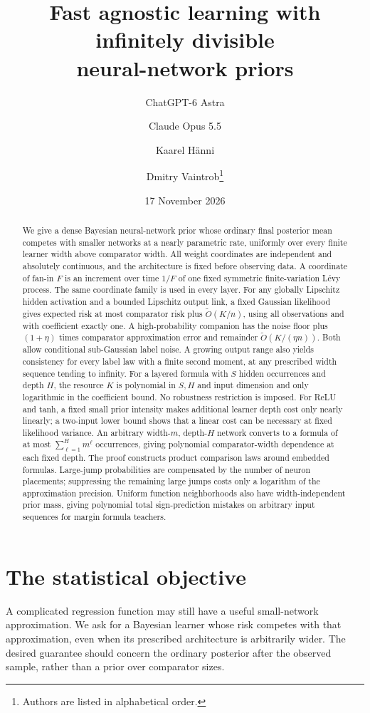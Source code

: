 \documentclass[11pt]{article}
\title{Fast agnostic learning with infinitely divisible\\neural-network priors}
\author{ChatGPT-6 Astra \and Claude Opus 5.5 \and Kaarel H\"anni \and
Dmitry Vaintrob\thanks{Authors are listed in alphabetical order.}}
\date{17 November 2026}
\theoremstyle{remark}\newtheorem{remark}[theorem]{Remark}
\begin{document}
\maketitle
\begin{abstract}
We give a dense Bayesian neural-network prior whose ordinary final posterior mean competes with smaller networks at a nearly parametric rate, uniformly over every finite learner width above comparator width. All weight coordinates are independent and absolutely continuous, and the architecture is fixed before observing data. A coordinate of fan-in $F$ is an increment over time $1/F$ of one fixed symmetric finite-variation L\'evy process. The same coordinate family is used in every layer. For any globally Lipschitz hidden activation and a bounded Lipschitz output link, a fixed Gaussian likelihood gives expected risk at most comparator risk plus $\widetilde O(K/n)$, using all observations and with coefficient exactly one. A high-probability companion has the noise floor plus $(1+\eta)$ times comparator approximation error and remainder $\widetilde O(K/(\eta n))$. Both allow conditional sub-Gaussian label noise. A growing output range also yields consistency for every label law with a finite second moment, at any prescribed width sequence tending to infinity. For a layered formula with $S$ hidden occurrences and depth $H$, the resource $K$ is polynomial in $S,H$ and input dimension and only logarithmic in the coefficient bound. No robustness restriction is imposed. For ReLU and tanh, a fixed small prior intensity makes additional learner depth cost only nearly linearly; a two-input lower bound shows that a linear cost can be necessary at fixed likelihood variance. An arbitrary width-$m$, depth-$H$ network converts to a formula of at most $\sum_{\ell=1}^H m^\ell$ occurrences, giving polynomial comparator-width dependence at each fixed depth. The proof constructs product comparison laws around embedded formulas. Large-jump probabilities are compensated by the number of neuron placements; suppressing the remaining large jumps costs only a logarithm of the approximation precision. Uniform function neighborhoods also have width-independent prior mass, giving polynomial total sign-prediction mistakes on arbitrary input sequences for margin formula teachers.
\end{abstract}

\section{The statistical objective}
A complicated regression function may still have a useful small-network approximation. We ask for a Bayesian learner whose risk competes with that approximation, even when its prescribed architecture is arbitrarily wider. The desired guarantee should concern the ordinary posterior after the observed sample, rather than a prior over comparator sizes.
\end{document}
